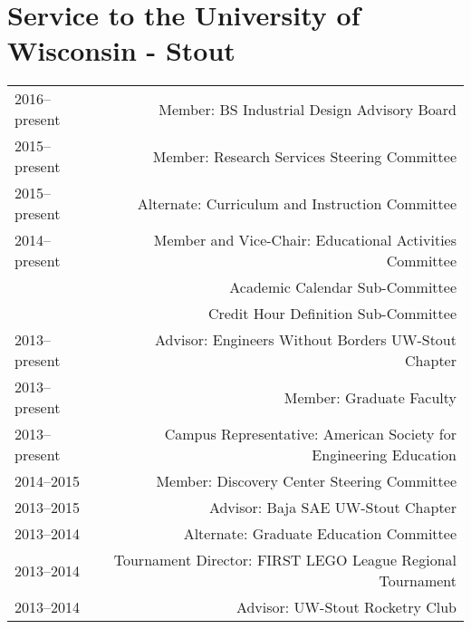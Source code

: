 \section*{Service to the University of Wisconsin - Stout}
\begin{tabular}{L!{\VRule}R}
2016--present&Member: BS Industrial Design Advisory Board\\
2015--present&Member: Research Services Steering Committee \\
2015--present&Alternate: Curriculum and Instruction Committee \\
2014--present&Member and Vice-Chair: Educational Activities Committee \\
 &Academic Calendar Sub-Committee \\
 &Credit Hour Definition Sub-Committee \\
2013--present&Advisor: Engineers Without Borders UW-Stout Chapter \\
2013--present&Member: Graduate Faculty \\
2013--present&Campus Representative: American Society for Engineering Education\\
2014--2015&Member: Discovery Center Steering Committee \\
2013--2015&Advisor: Baja SAE UW-Stout Chapter \\
2013--2014&Alternate: Graduate Education Committee \\
2013--2014&Tournament Director: FIRST LEGO League Regional Tournament\\
2013--2014&Advisor: UW-Stout Rocketry Club\\
\end{tabular}